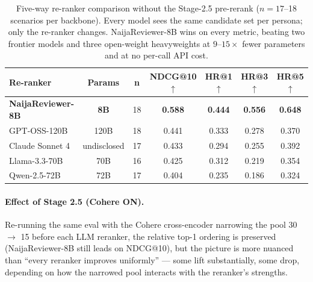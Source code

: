 \documentclass[sigconf,nonacm,balance]{acmart}
\begin{document}
\begin{table}[t]
\centering
\caption{Five-way re-ranker comparison without the Stage-2.5 pre-rerank
         ($n=17$--18 scenarios per backbone). Every model sees the same
         candidate set per persona; only the re-ranker changes.
         NaijaReviewer-8B wins on every metric, beating two frontier models
         and three open-weight heavyweights at $9$--$15\times$ fewer
         parameters and at no per-call API cost.}
\label{tab:taskB-5way}
\small
\begin{tabular}{lcccccc}
\toprule
\textbf{Re-ranker} & \textbf{Params} & \textbf{n} & \textbf{NDCG@10 $\uparrow$} &
\textbf{HR@1 $\uparrow$} & \textbf{HR@3 $\uparrow$} & \textbf{HR@5 $\uparrow$} \\
\midrule
\textbf{NaijaReviewer-8B} & \textbf{8B}  & 18 & \textbf{0.588} & \textbf{0.444} & \textbf{0.556} & \textbf{0.648} \\
GPT-OSS-120B              & 120B         & 18 & 0.441 & 0.333 & 0.278 & 0.370 \\
Claude Sonnet 4           & undisclosed  & 17 & 0.433 & 0.294 & 0.255 & 0.392 \\
Llama-3.3-70B             & 70B          & 16 & 0.425 & 0.312 & 0.219 & 0.354 \\
Qwen-2.5-72B              & 72B          & 17 & 0.404 & 0.235 & 0.186 & 0.324 \\
\bottomrule
\end{tabular}
\end{table}

\paragraph{Effect of Stage 2.5 (Cohere ON).}
Re-running the same eval with the Cohere cross-encoder narrowing the
pool 30 $\to$ 15 before each LLM reranker, the relative
top-1 ordering is preserved (NaijaReviewer-8B still leads on NDCG@10),
but the picture is more nuanced than ``every reranker improves
uniformly'' --- some lift substantially, some drop, depending on how
the narrowed pool interacts with the reranker's strengths.
\end{document}
